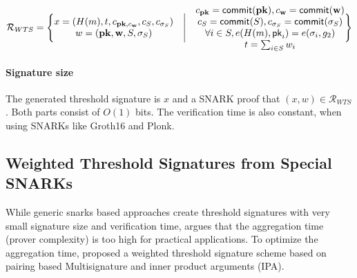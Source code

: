 \begin{equation*}
    \mathcal{R}_{WTS} = 
\Bigg\{\space \begin{matrix}
         x = (H(m), t, c_{\mathbf{pk}, c_{\mathbf{w}}}, c_{S}, c_{\sigma_{S}})\\
         w = (\mathbf{pk}, \mathbf{w}, S, \sigma_S)\\
    \end{matrix}\quad \Bigg| \quad \begin{matrix}
        c_{\mathbf{pk}} = \mathsf{commit}(\mathbf{pk}), 
        c_{\mathbf{w}} = \mathsf{commit}(\mathbf{w})\\
        c_{S} = \mathsf{commit}(S),
        c_{\sigma_{S}} = \mathsf{commit}(\sigma_S) \\
        \forall i\in S, e(H(m), \mathsf{pk}_i) = e(\sigma_i, g_2) \\
        t = \sum_{i\in S} w_i  \\
    \end{matrix}\space \Bigg\}
\end{equation*}

\paragraph{Signature size} The generated threshold signature is $x$ and a SNARK proof that $(x,w)\in \mathcal{R}_{WTS}$. Both parts consist of $O(1)$ bits. The verification time is also constant, when using SNARKs like Groth16 and Plonk. 

\subsection{Weighted Threshold Signatures from Special SNARKs}
While generic snarks based approaches create threshold signatures with very small signature size and verification time, \cite{DBLP:conf/ccs/DasCXNB023} argues that the aggregation time (prover complexity) is too high for practical applications. To optimize the aggregation time, \cite{DBLP:conf/ccs/DasCXNB023} proposed a weighted threshold signature scheme based on pairing based Multisignature and inner product arguments (IPA). 